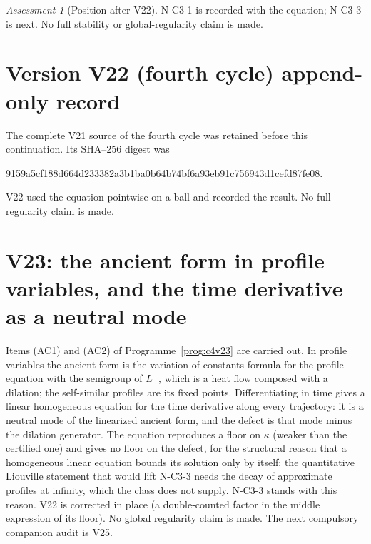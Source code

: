 \documentclass[11pt]{article}
\theoremstyle{plain}
\theoremstyle{definition}
\theoremstyle{remark}
\newtheorem{assessment}[theorem]{Assessment}
\begin{document}
\begin{assessment}[Position after V22]
\label{ass:c4v22-position}
N-C3-1 is recorded with the equation; N-C3-3 is next.  No full
stability or global-regularity claim is made.
\end{assessment}

\section*{Version V22 (fourth cycle) append-only record}

The complete V21 source of the fourth cycle was retained before this
continuation.  Its SHA--256 digest was
\begin{center}\scriptsize\ttfamily
9159a5cf188d664d233382a3b1ba0b64b74bf6a93eb91c756943d1cefd87fe08.
\end{center}
V22 used the equation pointwise on a ball and recorded the result.
No full regularity claim is made.

\section{V23: the ancient form in profile variables, and the time derivative as a neutral mode}
\label{sec:c4v23-entry}

Items (AC1) and (AC2) of Programme~\ref{prog:c4v23} are carried out.
In profile variables the ancient form is the variation-of-constants
formula for the profile equation with the semigroup of \(L_-\), which
is a heat flow composed with a dilation; the self-similar profiles
are its fixed points.  Differentiating in time gives a linear
homogeneous equation for the time derivative along every trajectory:
it is a neutral mode of the linearized ancient form, and the defect
is that mode minus the dilation generator.  The
equation reproduces a floor on \(\kappa\) (weaker than the certified one)
and gives no floor on the defect, for the structural reason that a
homogeneous linear equation bounds its solution only by itself; the
quantitative Liouville statement that would lift N-C3-3 needs the
decay of approximate profiles at infinity, which the class does not
supply.  N-C3-3 stands with this reason.  V22 is corrected in place
(a double-counted factor in the middle expression of its floor).  No
global regularity claim is made.  The next compulsory companion audit
is V25.
\end{document}
